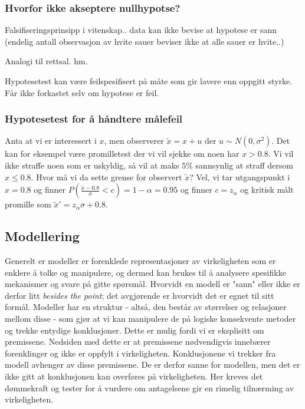 \subsubsection{Hvorfor ikke akseptere nullhypotse?}
Falsifiseringsprinsipp i vitenskap.. data kan ikke bevise at hypotese er sann (endelig antall observasjon av hvite sauer beviser ikke at alle sauer er hvite..)

Analogi til rettsal. hm. 

Hypotesetest kan være feilspesifisert på måte som gir lavere enn oppgitt styrke. Får ikke forkastet selv om hypotese er feil.
\subsubsection{Hypotesetest for å håndtere målefeil}
Anta at vi er interessert i $x$, men observerer $\tilde{x}=x+u$ der $u\sim N(0,\sigma^2)$. Det kan for eksempel være promilletest der vi vil sjekke om noen har $x>0.8$. Vi vil ikke straffe noen som er uskyldig, så vil at maks $5\%$ sannsynlig at straff dersom $x\leq 0.8$. Hvor må vi da sette grense for observert $\tilde{x}$? Vel, vi tar utgangspunkt i $x=0.8$ og finner $P\left(\frac{\tilde{x}-0.8}{\sigma}<c\right) = 1-\alpha = 0.95$ og finner $c=z_{\alpha}$ og kritisk målt promille som $\tilde{x}'= z_{\alpha}\sigma+0.8$.
\subsection{Modellering}
Generelt er modeller er forenklede representasjoner av virkeligheten som er enklere å tolke og manipulere, og dermed kan brukes til å analysere spesifikke mekanismer og svare på gitte spørsmål. Hvorvidt en modell er "sann" eller ikke er derfor litt \textit{besides the point}; det avgjørende er hvorvidt det er egnet til sitt formål. Modeller har en struktur - altså, den består av størrelser og relasjoner mellom disse - som gjør at vi kan manipulere de på logiske konsekvente metoder og trekke entydige konklusjoner. Dette er mulig fordi vi er eksplisitt om premissene. Nedsiden med dette er at premissene nødvendigvis innebærer forenklinger og ikke er oppfylt i virkeligheten. Konklusjonene vi trekker fra modell avhenger av disse premissene. De er derfor sanne for modellen, men det er ikke gitt at konklusjonen kan overføres på virkeligheten. Her kreves det dømmekraft og tester for å vurdere om antagelsene gir en rimelig tilnærming av virkeligheten. 

